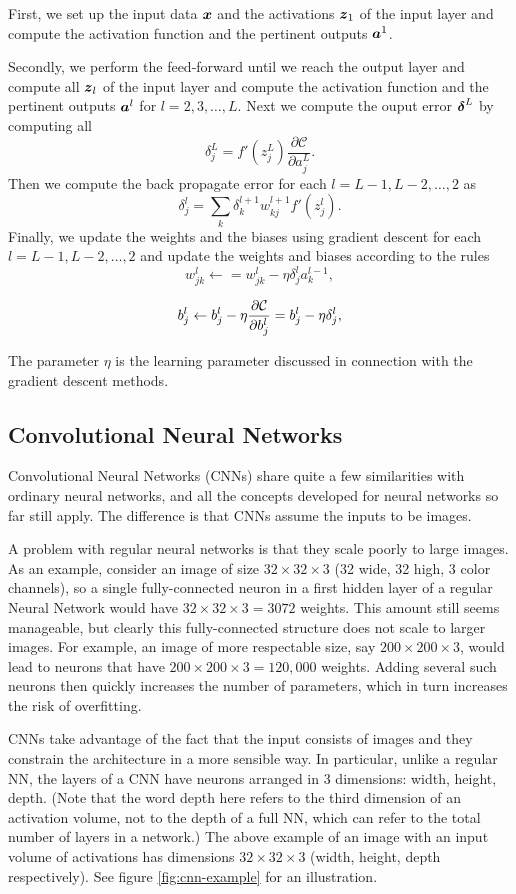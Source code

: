 First, we set up the input data ${\boldsymbol{x}}$ and the activations
${\boldsymbol{z}}_1$ of the input layer and compute the activation function and
the pertinent outputs ${\boldsymbol{a}}^1$.

Secondly, we perform the feed-forward until we reach the output
layer and compute all ${\boldsymbol{z}}_l$ of the input layer and compute the
activation function and the pertinent outputs ${\boldsymbol{a}}^l$ for
$l=2,3,\dots,L$.
Next we compute the ouput error ${\boldsymbol{\delta}}^L$ by computing all
$$\delta_j^L = f'(z_j^L)\frac{\partial\mathcal{C}}{\partial a_j^L}.$$
Then we compute the back propagate error for each $l=L-1,L-2,\dots,2$ as
$$\delta_j^l = \sum_k \delta_k^{l+1}w_{kj}^{l+1}f'(z_j^l).$$
Finally, we update the weights and the biases using gradient descent for 
each $l=L-1,L-2,\dots,2$ and update the weights and biases according to the rules
$$w_{jk}^l\leftarrow  = w_{jk}^l- \eta \delta_j^la_k^{l-1},$$

$$b_j^l \leftarrow b_j^l-\eta \frac{\partial {\cal C}}{\partial b_j^l}=b_j^l-\eta \delta_j^l,$$

\noindent The parameter $\eta$ is the learning parameter discussed in connection with the 
gradient descent methods.

\subsection{Convolutional Neural Networks}
Convolutional Neural Networks (CNNs) share quite a few similarities with
ordinary neural networks, and all the concepts developed for neural networks
so far still apply. The difference is that CNNs assume the inputs to be images.

A problem with regular neural networks is that they scale poorly to large images.
As an example, consider an image of size $32\times 32\times 3$ 
(32 wide, 32 high, 3 color channels), so a single fully-connected neuron in a first 
hidden layer of a regular Neural Network would have 
$32\times 32\times 3 = 3072$ weights. This amount still seems manageable, but
clearly this fully-connected structure does not scale to larger images. For example,
an image of more respectable size, say $200\times 200\times 3$, would lead to neurons
that have $200\times 200\times 3 = 120,000$ weights. Adding several such neurons then
quickly increases the number of parameters, which in turn increases the risk of overfitting.

\noindent CNNs take advantage of the fact that the input consists of images and they
constrain the architecture in a more sensible way. In particular, unlike a regular 
NN, the layers of a CNN have neurons arranged in 3 dimensions: width, height, depth. 
(Note that the word depth here refers to the third dimension of an activation volume,
not to the depth of a full NN, which can refer to the total number of layers in a 
network.) The above example of an image with an input volume of activations has 
dimensions $32\times 32\times 3$ (width, height, depth respectively).
See figure \ref{fig:cnn-example} for an illustration.

